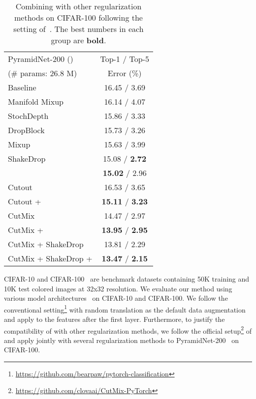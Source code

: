 \documentclass[final]{cvpr}
\begin{document}
\begin{table}[t]
    \centering
    \begin{tabular}{l|c}
\toprule
PyramidNet-200 () &Top-1 / Top-5\\
(\# params: 26.8 M) & Error (\%)\\
\midrule
\midrule
    Baseline &16.45 / 3.69 \\
    Manifold Mixup~\cite{zhang2017mixup}&16.14 / 4.07 \\
    StochDepth~\cite{huang2016deep}& 15.86 / 3.33\\
    DropBlock~\cite{ghiasi2018dropblock}&15.73 / 3.26 \\
    Mixup~\cite{zhang2017mixup}&15.63 / 3.99 \\
    ShakeDrop~\cite{yamada2018shakedrop} & 15.08 /\textbf{ 2.72}\\
    \methodname{}&\textbf{15.02} / 2.96\\
\midrule
    Cutout~\cite{devries2017cutout}&16.53 / 3.65  \\
    Cutout + \methodname{}& \textbf{15.11} / \textbf{3.23} \\
    \midrule
    CutMix~\cite{yun2019cutmix}& 14.47 / 2.97\\
    CutMix + \methodname{}& \textbf{13.95} / \textbf{2.95} \\
    \midrule
    CutMix + ShakeDrop~\cite{yamada2018shakedrop} & 13.81 / 2.29\\
    CutMix + ShakeDrop + \methodname{}&    \textbf{13.47} / \textbf{2.15} \\
\bottomrule
\end{tabular}
\caption{Combining \methodname{} with other regularization methods on CIFAR-100 following the setting of~\cite{yun2019cutmix}. The best numbers in each group are \textbf{bold}.}
\label{tab:moex_cifar100_result2}     \vspace{-0.2in}
\end{table}

\label{subsec:cifar}
CIFAR-10 and CIFAR-100~\cite{krizhevsky2009learning} are benchmark datasets containing 50K training and 10K test colored images at 32x32 resolution. We evaluate our method using various model architectures~\cite{He2015,huang2017densely,xie2017aggregated,zagoruyko2016wide,han2017deep} on CIFAR-10 and CIFAR-100. We follow the conventional setting\footnote{\href{https://github.com/bearpaw/pytorch-classification}{https://github.com/bearpaw/pytorch-classification}} with random translation as the default data augmentation and apply \methodname{} to the features after the first layer. 
Furthermore, to justify the compatibility of \methodname{} with other regularization methods, we follow the official setup\footnote{\href{https://github.com/clovaai/CutMix-PyTorch}{https://github.com/clovaai/CutMix-PyTorch}} of \citep{yun2019cutmix} and apply \methodname{} jointly with several regularization methods to PyramidNet-200~\cite{han2017deep} on CIFAR-100.
\end{document}
